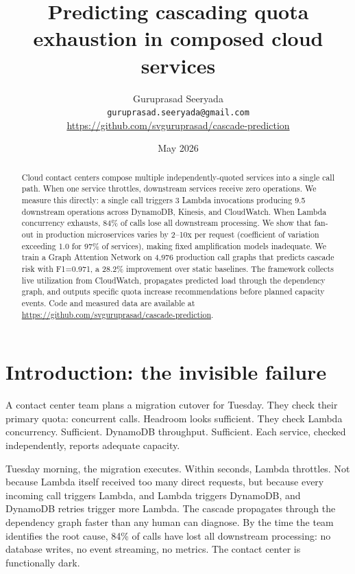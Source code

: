 \documentclass{article}
\title{Predicting cascading quota exhaustion in composed cloud services}
\author{
  Guruprasad Seeryada \\
  \texttt{guruprasad.seeryada@gmail.com} \\
  \url{https://github.com/svguruprasad/cascade-prediction}
}
\date{May 2026}
\begin{document}
\maketitle

\begin{abstract}
Cloud contact centers compose multiple independently-quoted services into a single call path. When one service throttles, downstream services receive zero operations. We measure this directly: a single call triggers 3 Lambda invocations producing 9.5 downstream operations across DynamoDB, Kinesis, and CloudWatch. When Lambda concurrency exhausts, 84\% of calls lose all downstream processing. We show that fan-out in production microservices varies by 2--10x per request (coefficient of variation exceeding 1.0 for 97\% of services), making fixed amplification models inadequate. We train a Graph Attention Network on 4,976 production call graphs that predicts cascade risk with F1=0.971, a 28.2\% improvement over static baselines. The framework collects live utilization from CloudWatch, propagates predicted load through the dependency graph, and outputs specific quota increase recommendations before planned capacity events. Code and measured data are available at \url{https://github.com/svguruprasad/cascade-prediction}.
\end{abstract}

\section{Introduction: the invisible failure}

A contact center team plans a migration cutover for Tuesday. They check their primary quota: concurrent calls. Headroom looks sufficient. They check Lambda concurrency. Sufficient. DynamoDB throughput. Sufficient. Each service, checked independently, reports adequate capacity.

Tuesday morning, the migration executes. Within seconds, Lambda throttles. Not because Lambda itself received too many direct requests, but because every incoming call triggers Lambda, and Lambda triggers DynamoDB, and DynamoDB retries trigger more Lambda. The cascade propagates through the dependency graph faster than any human can diagnose. By the time the team identifies the root cause, 84\% of calls have lost all downstream processing: no database writes, no event streaming, no metrics. The contact center is functionally dark.
\end{document}
